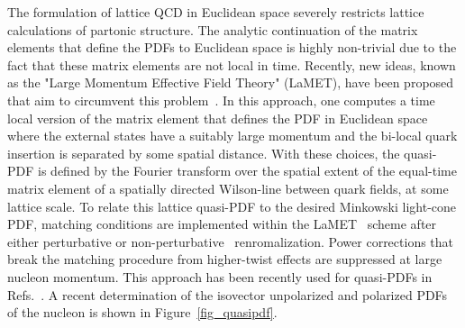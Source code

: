 The formulation of lattice QCD in Euclidean space severely restricts
lattice calculations of partonic structure.  
The analytic continuation of the matrix elements that define the PDFs to Euclidean space is highly non-trivial due to the fact that these matrix elements are not local in time. Recently, new ideas,  known as the "Large Momentum Effective Field Theory" (LaMET),  have
been proposed that aim to circumvent this problem~\cite{Ji:2013dva,Ji:2014gla}.
In this approach, one computes a time local version of the matrix element that defines the PDF in Euclidean space
where the external states have a suitably large momentum  and the
bi-local quark insertion is separated by some spatial distance.
%
%
With these choices, the quasi-PDF is defined by the Fourier transform over the spatial extent of the equal-time matrix element of a spatially directed Wilson-line between quark fields, at some lattice scale. To relate this lattice quasi-PDF to the desired Minkowski light-cone PDF, matching conditions are implemented within the LaMET~\cite{Ji:2013dva,Ji:2014gla} scheme after either perturbative or non-perturbative~\cite{Martinelli:1994ty} renromalization. Power corrections that break the matching  procedure from  higher-twist effects are suppressed at large nucleon momentum. This approach has been recently used  for quasi-PDFs  in Refs.~\cite{Alexandrou:2017huk,Chen:2017mzz,Green:2017xeu,Chen:2018xof,Lin:2018qky}. A recent determination of the isovector unpolarized and polarized PDFs of the  nucleon is shown in Figure~\ref{fig_quasipdf}.

